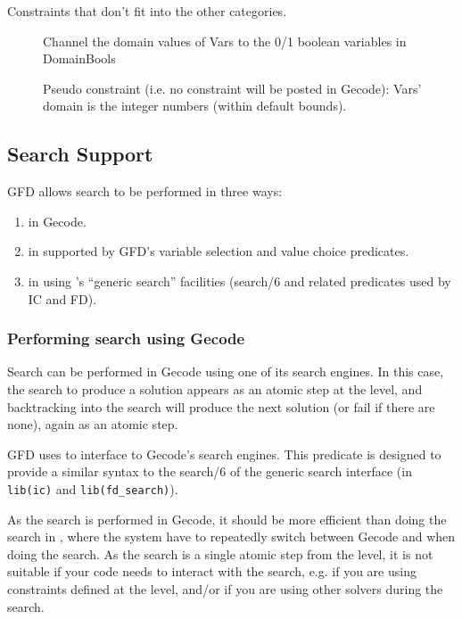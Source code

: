 Constraints that don't fit into the other categories.

\begin{description}

\item[]
Channel the domain values of Vars to the 0/1 boolean variables in DomainBools

\item[]
Pseudo constraint (i.e. no constraint will be posted in Gecode): Vars' domain is the integer numbers (within default bounds).

\end{description}


\subsection{Search Support}

GFD allows search to be performed in three ways:

\begin{enumerate}
\item in Gecode. 
\item in \eclipse supported by GFD's variable selection 
and value choice predicates. 
\item in \eclipse using \eclipse's ``generic search'' 
facilities (search/6 and related predicates used by IC and FD). 
\end{enumerate}

\subsubsection{Performing search using Gecode}
\label{searcheng}
Search can be performed in Gecode using one of its search engines. 
In this 
case, the search to produce a solution appears as an atomic step at
the \eclipse level, and backtracking into the search will produce the next 
solution (or fail if there are none), again as an atomic step.

GFD uses 
to interface to Gecode's search engines. This predicate is
designed to provide a similar syntax to the search/6 of the generic search 
interface (in {\tt lib(ic)} and {\tt lib(fd_search)}). 

As the search is performed in Gecode, it should be more efficient than doing
the search in \eclipse, where the system have to repeatedly switch between
Gecode and \eclipse when doing the search. As the search is a single atomic
step from the \eclipse level, it is not suitable if your code needs to
interact with the search, e.g. if you are using constraints defined at the
\eclipse level, and/or if you are using other solvers during the search.

